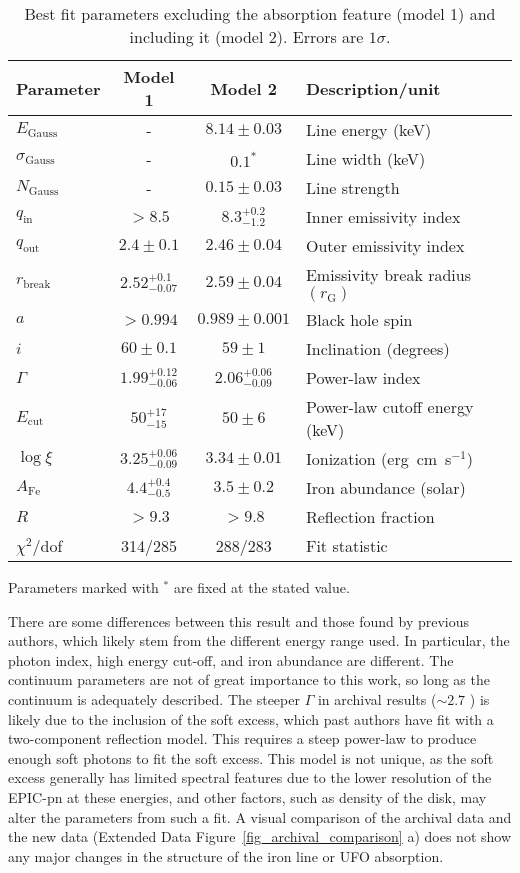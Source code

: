 \documentclass[10pt, a4paper]{article}
\begin{document}
\begin{table}[h]
\centering
\caption{Best fit parameters excluding the absorption feature (model 1) and including it (model 2). Errors are $1\sigma$.}
\label{table_fitpars}
\begin{tabular}{l c c l}
\hline
Parameter & Model 1 & Model 2 & Description/unit\\
\hline
$E_\mathrm{Gauss}$ 	&-& $8.14\pm0.03$ & Line energy (keV)\\
$\sigma_{\mathrm{Gauss}}$	&-& $0.1^*$	& Line width (keV)\\
$N_\mathrm{Gauss}$ & -	& $0.15\pm0.03$ & Line strength\\

$q_\mathrm{in}$	&$>8.5$ &$8.3_{-1.2}^{+0.2}$  & Inner emissivity index\\
$q_\mathrm{out}$&$2.4\pm0.1$ &$2.46\pm0.04$ & Outer emissivity index\\
$r_\mathrm{break}$ & $2.52_{-0.07}^{+0.1}$& $2.59\pm0.04$ & Emissivity break radius $(r_\mathrm{G})$ \\
$a$ & $>0.994$&$0.989\pm0.001$	& Black hole spin\\
$i$ &$60\pm0.1$& $59\pm1$  & Inclination (degrees)\\
$\Gamma$ &$1.99_{-0.06}^{+0.12}$ & $2.06_{-0.09}^{+0.06}$ &Power-law index\\
$E_\mathrm{cut}$  &$50_{-15}^{+17}$ & $50\pm6$ & Power-law cutoff energy (keV)\\
$\log{\xi}$ &$3.25_{-0.09}^{+0.06}$ &$3.34\pm0.01$&Ionization (erg~cm~s$^{-1}$) \\
$A_\mathrm{Fe}$ &$4.4_{-0.5}^{+0.4}$ & $3.5\pm0.2$ & Iron abundance (solar)\\
$R$ &$>9.3$ & $>9.8$ & Reflection fraction\\
$\chi^2/$dof & 314/285 & 288/283 & Fit statistic\\

\hline
\end{tabular}

\vspace{5pt}
Parameters marked with $^*$ are fixed at the stated value.
\end{table}

There are some differences between this result and those found by previous authors, which likely stem from the different energy range used. In particular, the photon index, high energy cut-off, and iron abundance are different. The continuum parameters are not of great importance to this work, so long as the continuum is adequately described. The steeper $\Gamma$ in archival results ($\sim2.7$ \cite{Chiang15})  is likely due to the inclusion of the soft excess, which past authors have fit with a two-component reflection model. This requires a steep power-law to produce enough soft photons to fit the soft excess. This model is not unique, as the soft excess generally has limited spectral features due to the lower resolution of the EPIC-pn at these energies, and other factors, such as density of the disk, may alter the parameters from such a fit\cite{Garcia16}. A visual comparison of the archival data and the new data (Extended Data Figure~\ref{fig_archival_comparison} a) does not show any major changes in the structure of the iron line or UFO absorption.
\end{document}
